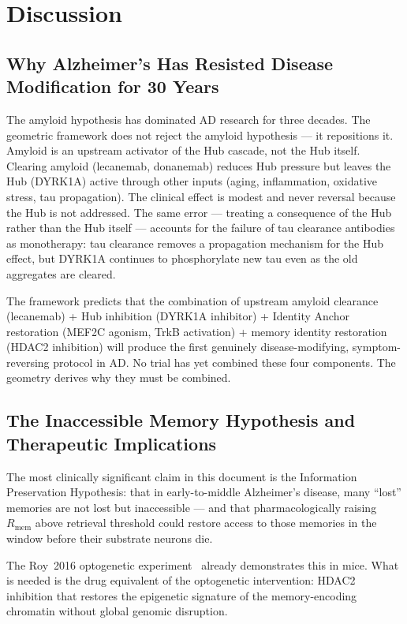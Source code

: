 \documentclass[12pt,a4paper]{article}
\newcommand{\RMEM}{R_{\mathrm{mem}}}
\begin{document}
\section{Discussion}

\subsection{Why Alzheimer's Has Resisted Disease
Modification for 30 Years}

The amyloid hypothesis has dominated AD research for
three decades. The geometric framework does not reject
the amyloid hypothesis --- it repositions it. Amyloid
is an upstream activator of the Hub cascade, not the
Hub itself. Clearing amyloid (lecanemab, donanemab)
reduces Hub pressure but leaves the Hub (DYRK1A)
active through other inputs (aging, inflammation,
oxidative stress, tau propagation). The clinical
effect is modest and never reversal because the Hub
is not addressed. The same error --- treating a
consequence of the Hub rather than the Hub itself ---
accounts for the failure of tau clearance antibodies
as monotherapy: tau clearance removes a propagation
mechanism for the Hub effect, but DYRK1A continues
to phosphorylate new tau even as the old aggregates
are cleared.

The framework predicts that the combination of
upstream amyloid clearance (lecanemab) + Hub
inhibition (DYRK1A inhibitor) + Identity Anchor
restoration (MEF2C agonism, TrkB activation) +
memory identity restoration (HDAC2 inhibition) will
produce the first genuinely disease-modifying,
symptom-reversing protocol in AD. No trial has
yet combined these four components. The geometry
derives why they must be combined.

\subsection{The Inaccessible Memory Hypothesis
and Therapeutic Implications}

The most clinically significant claim in this
document is the Information Preservation Hypothesis:
that in early-to-middle Alzheimer's disease, many
``lost'' memories are not lost but inaccessible ---
and that pharmacologically raising $\RMEM$ above
retrieval threshold could restore access to those
memories in the window before their substrate neurons die.

The Roy~2016 optogenetic experiment~\cite{Roy2016}
already demonstrates this in mice. What is needed
is the drug equivalent of the optogenetic
intervention: HDAC2 inhibition that restores the
epigenetic signature of the memory-encoding chromatin
without global genomic disruption.
\end{document}
